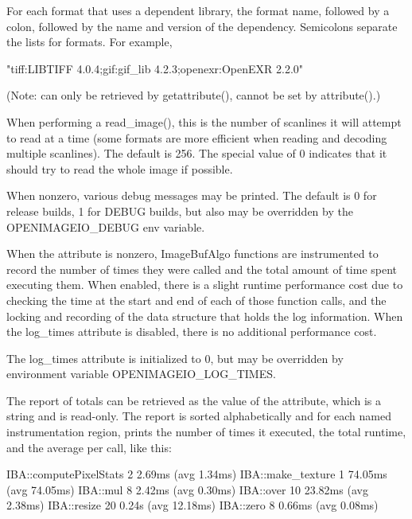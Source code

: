 \vspace{10pt}
For each format that uses a dependent library, the format name, followed by
a colon, followed by the name and version of the dependency. Semicolons
separate the lists for formats.  For example,
\begin{code}
     "tiff:LIBTIFF 4.0.4;gif:gif_lib 4.2.3;openexr:OpenEXR 2.2.0"
\end{code}
(Note: can only be retrieved by {\cf getattribute()}, cannot be set by
{\cf attribute()}.)
\apiend

\vspace{10pt}
When performing a {\cf read_image()}, this is the number of scanlines it
will attempt to read at a time (some formats are more efficient when reading
and decoding multiple scanlines).  The default is 256.  The special value
of 0 indicates that it should try to read the whole image if possible.
\apiend

\vspace{10pt}
When nonzero, various debug messages may be printed. The default is 0 for
release builds, 1 for {\cf DEBUG} builds, but also may be overridden by the
{\cf OPENIMAGEIO\_DEBUG} env variable.
\apiend

\vspace{10pt}
 
\NEW %

When the  attribute is nonzero, {\cf ImageBufAlgo} functions
are instrumented to record the number of times they were called and the
total amount of time spent executing them. When enabled, there is a slight
runtime performance cost due to checking the time at the start and end of
each of those function calls, and the locking and recording of the data
structure that holds the log information. When the {\cf log_times} attribute
is disabled, there is no additional performance cost.

The {\cf log_times} attribute is initialized to 0, but may be overridden by
environment variable {\cf OPENIMAGEIO_LOG_TIMES}.

The report of totals can be retrieved as the value of the
 attribute, which is a string and is read-only. The
report is sorted alphabetically and for each named instrumentation region,
prints the number of times it executed, the total runtime, and the average
per call, like this:
\begin{code}
    IBA::computePixelStats        2   2.69ms  (avg   1.34ms)
    IBA::make_texture             1  74.05ms  (avg  74.05ms)
    IBA::mul                      8   2.42ms  (avg   0.30ms)
    IBA::over                    10  23.82ms  (avg   2.38ms)
    IBA::resize                  20   0.24s   (avg  12.18ms)
    IBA::zero                     8   0.66ms  (avg   0.08ms)
\end{code}

